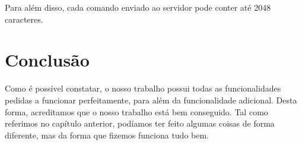 \documentclass[a4paper]{report}
\begin{document}
	Para além disso, cada comando enviado ao servidor pode conter até 2048 caracteres.

	\chapter{Conclusão}
	
	Como é possível constatar, o nosso trabalho possui todas as funcionalidades pedidas a funcionar perfeitamente, para além da funcionalidade adicional. Desta forma, acreditamos que o nosso trabalho está bem conseguido. Tal como referimos no capítulo anterior, podíamos ter feito algumas coisas de forma diferente, mas da forma que fizemos funciona tudo bem.
\end{document}
